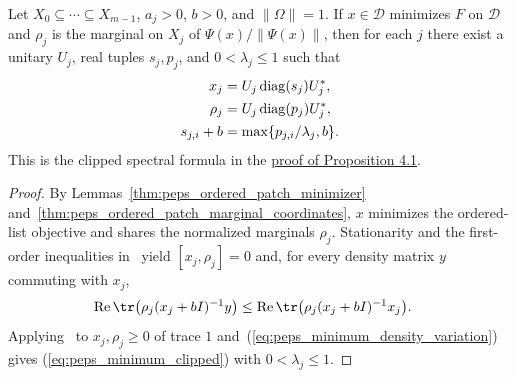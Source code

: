 \begin{lemma}
    \label{thm:peps_patch_minimum_clipped}
    \leanok
    Let $X_0\subseteq\cdots\subseteq X_{m-1}$, $a_j>0$, $b>0$,
    and $\|\Omega\|=1$. If $x\in\mathcal D$
    minimizes $F$ on $\mathcal D$ and $\rho_j$ is the marginal on $X_j$
    of $\Psi(x)/\|\Psi(x)\|$, then for each $j$ there exist a unitary $U_j$, real tuples $s_j,p_j$,
    and $0<\lambda_j\le1$ such that
    \begin{align}
        x_j       & = U_j\operatorname{diag}(s_j)U_j^*, \notag \\
        \rho_j    & = U_j\operatorname{diag}(p_j)U_j^*, \notag \\
        s_{j,i}+b & = \max\{p_{j,i}/\lambda_j,b\}.
        \label{eq:peps_minimum_clipped}
    \end{align}
    This is the clipped spectral formula in the
    \href{https://github.com/openai/math/blob/adc7f1241b42e322a6451854ab7e4b4c146bf78a/preprints/Polynomial-PEPS-approximation-of-gapped-square-grid-ground-states-September-24-2026/build/sections/03-patches.tex\#L170-L200}{proof of Proposition 4.1}.
\end{lemma}
\begin{proof}\leanok
    By Lemmas~\ref{thm:peps_ordered_patch_minimizer} and~\ref{thm:peps_ordered_patch_marginal_coordinates}, $x$ minimizes the ordered-list objective and shares the normalized marginals $\rho_j$. Stationarity and the first-order inequalities in~\cite[``Stationarity of the ordered patch objective'' and ``First-order inequalities for normalized patch outputs'']{QICLean2026Blueprint} yield $[x_j,\rho_j]=0$ and, for every density matrix $y$ commuting with $x_j$,
    \begin{align}
        \operatorname{Re}\tr\bigl(\rho_j(x_j+bI)^{-1}y\bigr)
         & \leq \operatorname{Re}\tr\bigl(\rho_j(x_j+bI)^{-1}x_j\bigr).
        \label{eq:peps_minimum_density_variation}
    \end{align}
    Applying~\cite[``Clipped joint eigenvalues'']{QICLean2026Blueprint} to $x_j,\rho_j\ge0$ of trace $1$ and~(\ref{eq:peps_minimum_density_variation}) gives (\ref{eq:peps_minimum_clipped}) with $0<\lambda_j\le1$.
\end{proof}

